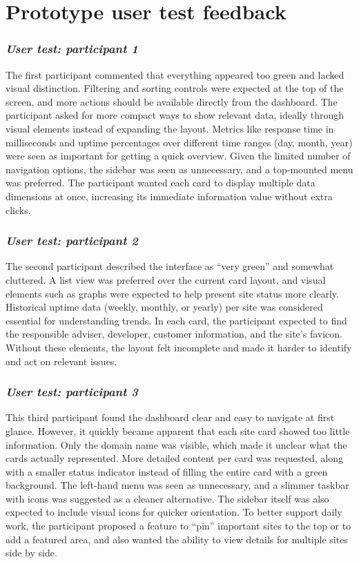\section{Prototype user test feedback}
\label{app:prototype_user_test}

\subsubsection{\textit{\textbf{User test: participant 1}}}
The first participant commented that everything appeared too green and lacked visual distinction. Filtering and sorting controls were expected at the top of the screen, and more actions should be available directly from the dashboard. The participant asked for more compact ways to show relevant data, ideally through visual elements instead of expanding the layout. Metrics like response time in milliseconds and uptime percentages over different time ranges (day, month, year) were seen as important for getting a quick overview. Given the limited number of navigation options, the sidebar was seen as unnecessary, and a top-mounted menu was preferred. The participant wanted each card to display multiple data dimensions at once, increasing its immediate information value without extra clicks.

\subsubsection{\textit{\textbf{User test: participant 2}}}
The second participant described the interface as “very green” and somewhat cluttered. A list view was preferred over the current card layout, and visual elements such as graphs were expected to help present site status more clearly. Historical uptime data (weekly, monthly, or yearly) per site was considered essential for understanding trends. In each card, the participant expected to find the responsible adviser, developer, customer information, and the site’s favicon. Without these elements, the layout felt incomplete and made it harder to identify and act on relevant issues.

\subsubsection{\textit{\textbf{User test: participant 3}}}
This third participant found the dashboard clear and easy to navigate at first glance. However, it quickly became apparent that each site card showed too little information. Only the domain name was visible, which made it unclear what the cards actually represented. More detailed content per card was requested, along with a smaller status indicator instead of filling the entire card with a green background. The left-hand menu was seen as unnecessary, and a slimmer taskbar with icons was suggested as a cleaner alternative. The sidebar itself was also expected to include visual icons for quicker orientation. To better support daily work, the participant proposed a feature to “pin” important sites to the top or to add a featured area, and also wanted the ability to view details for multiple sites side by side.